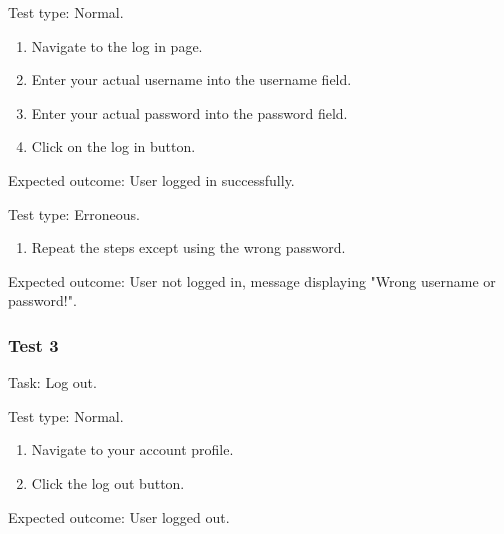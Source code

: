 {\sffamily Test type: Normal.}\\

\begin{enumerate}
  \item Navigate to the log in page.
  \item Enter your actual username into the username field.
  \item Enter your actual password into the password field.
  \item Click on the log in button.
\end{enumerate}

{\sffamily Expected outcome:} User logged in successfully. \\

{\color{gray} \hrulefill}

{\sffamily Test type: Erroneous.}\\

\begin{enumerate}
  \item Repeat the steps except using the wrong password.
\end{enumerate}

{\sffamily Expected outcome:} User not logged in,
message displaying "Wrong username or password!". \\

{\color{gray} \hrulefill}

\vspace{0.2cm}

\subsubsection{Test 3}

{\sffamily Task:} Log out.\\

{\color{gray} \hrulefill}

{\sffamily Test type: Normal.}\\

\begin{enumerate}
  \item Navigate to your account profile.
  \item Click the log out button.
\end{enumerate}

{\sffamily Expected outcome:} User logged out. \\

{\color{gray} \hrulefill}

\vspace{0.2cm}

